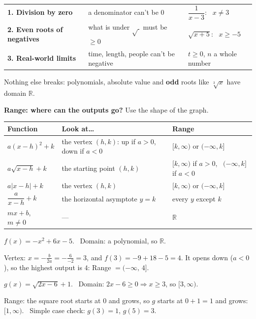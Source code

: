 \documentclass[11pt,letterpaper]{article}
\newcommand{\R}{\mathbb{R}}
\begin{document}
\begin{idea}
\begin{tabular}{@{}lll@{}}
\textbf{1. Division by zero} & a denominator can't be $0$ & $\dfrac{1}{x-3}$: \ $x\neq3$\\[8pt]
\textbf{2. Even roots of negatives} & what is under $\sqrt{\ }$ must be $\ge0$ & $\sqrt{x+5}$: \ $x\ge-5$\\[4pt]
\textbf{3. Real-world limits} & time, length, people can't be negative & $t\ge0$, $n$ a whole number
\end{tabular}\par\smallskip
Nothing else breaks: polynomials, absolute value and \textbf{odd} roots like $\sqrt[3]{x}$ have domain $\R$.
\end{idea}

\textbf{Range: where can the outputs go?} Use the shape of the graph.

\begin{center}
\renewcommand{\arraystretch}{1.3}
\begin{tabular}{@{}lll@{}}
\toprule
\textbf{Function} & \textbf{Look at\ldots} & \textbf{Range}\\ \midrule
$a(x-h)^2+k$ & the vertex $(h,k)$: up if $a>0$, down if $a<0$ & $[k,\infty)$ or $(-\infty,k]$\\
$a\sqrt{x-h}+k$ & the starting point $(h,k)$ & $[k,\infty)$ if $a>0$, \ $(-\infty,k]$ if $a<0$\\
$a|x-h|+k$ & the vertex $(h,k)$ & $[k,\infty)$ or $(-\infty,k]$\\
$\dfrac{a}{x-h}+k$ & the horizontal asymptote $y=k$ & every $y$ except $k$\\
$mx+b$, \ $m\neq0$ & — & $\R$\\
\bottomrule
\end{tabular}
\end{center}

\begin{example}
$f(x)=-x^2+6x-5$. \ Domain: a polynomial, so $\R$. \par
Vertex: $x=-\frac{b}{2a}=-\frac{6}{-2}=3$, and $f(3)=-9+18-5=4$. It opens down ($a<0$), so the highest output is $4$:
\quad Range $=(-\infty,\,4]$.
\end{example}

\begin{example}
$g(x)=\sqrt{2x-6}+1$. \ Domain: $2x-6\ge0 \Rightarrow x\ge3$, so $[3,\infty)$.\par
Range: the square root starts at $0$ and grows, so $g$ starts at $0+1=1$ and grows: $[1,\infty)$. \ Simple case check: $g(3)=1$, $g(5)=3$. \checkmark
\end{example}
\end{document}
